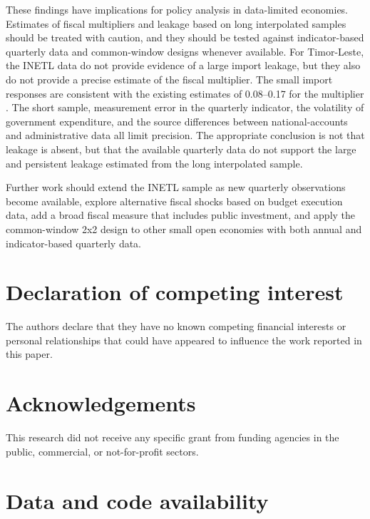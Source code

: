 \documentclass[11pt,a4paper]{article}
\begin{document}
These findings have implications for policy analysis in data-limited economies. Estimates of fiscal multipliers and leakage based on long interpolated samples should be treated with caution, and they should be tested against indicator-based quarterly data and common-window designs whenever available. For Timor-Leste, the INETL data do not provide evidence of a large import leakage, but they also do not provide a precise estimate of the fiscal multiplier. The small import responses are consistent with the existing estimates of 0.08--0.17 for the multiplier \parencite{worldbank2021,imf2024}. The short sample, measurement error in the quarterly indicator, the volatility of government expenditure, and the source differences between national-accounts and administrative data all limit precision. The appropriate conclusion is not that leakage is absent, but that the available quarterly data do not support the large and persistent leakage estimated from the long interpolated sample.

Further work should extend the INETL sample as new quarterly observations become available, explore alternative fiscal shocks based on budget execution data, add a broad fiscal measure that includes public investment, and apply the common-window 2x2 design to other small open economies with both annual and indicator-based quarterly data.

\section*{Declaration of competing interest}
The authors declare that they have no known competing financial interests or personal relationships that could have appeared to influence the work reported in this paper.

\section*{Acknowledgements}
This research did not receive any specific grant from funding agencies in the public, commercial, or not-for-profit sectors.

\section*{Data and code availability}
\label{sec:repro}
\end{document}
